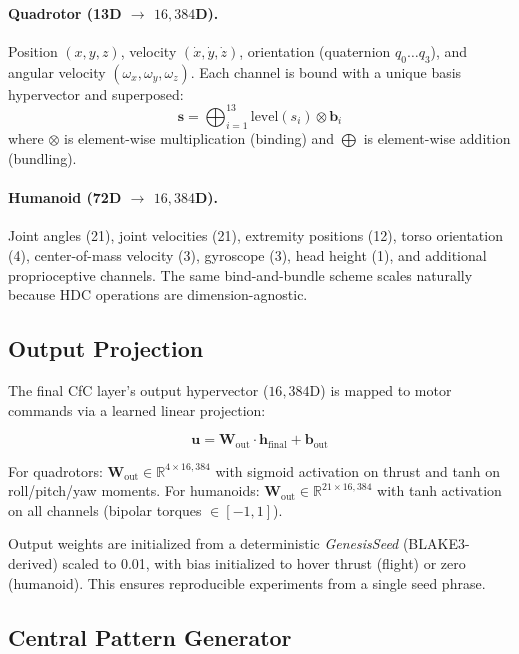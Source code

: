 \documentclass[11pt,twocolumn]{article}
\newcommand{\R}{\ensuremath{\mathbb{R}}}
\newcommand{\hdcdim}{16{,}384}
\begin{document}
\paragraph{Quadrotor (13D $\to$ $\hdcdim$D).} Position $(x,y,z)$, velocity $(\dot{x},\dot{y},\dot{z})$, orientation (quaternion $q_0 \ldots q_3$), and angular velocity $(\omega_x, \omega_y, \omega_z)$. Each channel is bound with a unique basis hypervector and superposed:
\begin{equation}
\mathbf{s} = \bigoplus_{i=1}^{13} \text{level}(s_i) \otimes \mathbf{b}_i
\end{equation}
where $\otimes$ is element-wise multiplication (binding) and $\bigoplus$ is element-wise addition (bundling).

\paragraph{Humanoid (72D $\to$ $\hdcdim$D).} Joint angles (21), joint velocities (21), extremity positions (12), torso orientation (4), center-of-mass velocity (3), gyroscope (3), head height (1), and additional proprioceptive channels. The same bind-and-bundle scheme scales naturally because HDC operations are dimension-agnostic.

\subsection{Output Projection}

The final CfC layer's output hypervector ($\hdcdim$D) is mapped to motor commands via a learned linear projection:

\begin{equation}
\mathbf{u} = \mathbf{W}_{\text{out}} \cdot \mathbf{h}_{\text{final}} + \mathbf{b}_{\text{out}}
\end{equation}

For quadrotors: $\mathbf{W}_{\text{out}} \in \R^{4 \times \hdcdim}$ with sigmoid activation on thrust and tanh on roll/pitch/yaw moments. For humanoids: $\mathbf{W}_{\text{out}} \in \R^{21 \times \hdcdim}$ with tanh activation on all channels (bipolar torques $\in [-1, 1]$).

Output weights are initialized from a deterministic \emph{GenesisSeed} (BLAKE3-derived) scaled to 0.01, with bias initialized to hover thrust (flight) or zero (humanoid). This ensures reproducible experiments from a single seed phrase.

\subsection{Central Pattern Generator}
\label{sec:cpg}
\end{document}
